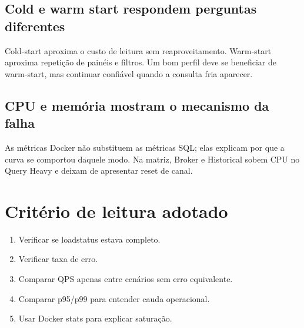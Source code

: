 \documentclass[11pt,a4paper]{article}
\begin{document}
\subsection{Cold e warm start respondem perguntas diferentes}

Cold-start aproxima o custo de leitura sem reaproveitamento. Warm-start aproxima repetição de painéis e filtros. Um bom perfil deve se beneficiar de warm-start, mas continuar confiável quando a consulta fria aparecer.

\subsection{CPU e memória mostram o mecanismo da falha}

As métricas Docker não substituem as métricas SQL; elas explicam por que a curva se comportou daquele modo. Na matriz, Broker e Historical sobem CPU no Query Heavy e deixam de apresentar reset de canal.

\section{Critério de leitura adotado}

\begin{enumerate}

\item Verificar se loadstatus estava completo.

\item Verificar taxa de erro.

\item Comparar QPS apenas entre cenários sem erro equivalente.

\item Comparar p95/p99 para entender cauda operacional.

\item Usar Docker stats para explicar saturação.

\end{enumerate}
\end{document}
